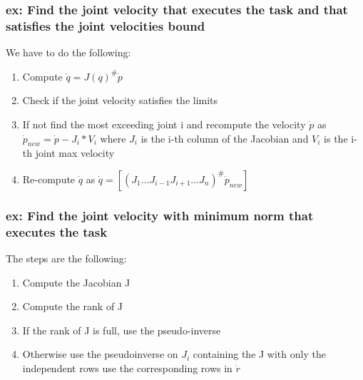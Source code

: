 \documentclass[a4paper,12pt]{article}
\begin{document}
\subsubsection{ex: Find the joint velocity that executes the task and that satisfies the joint velocities bound}
We have to do the following:
\begin{enumerate}
    \item Compute $\dot{q}=J(q)^{\#}\dot{p}$
    \item Check if the joint velocity satisfies the limits
    \item If not find  the most exceeding joint i and recompute the 
    velocity $\dot{p}$ as $\dot{p}_{new}=\dot{p} - J_i*V_i$
    where $J_i$ is the i-th column of the Jacobian and $V_i$ is 
    the i-th joint max velocity
    \item Re-compute $\dot{q}$ as $\dot{q}=[(J_1 \dots J_{i-1}J_{i+1} \dots J_n)^{\#}\dot{p}_{new}]$
\end{enumerate}

\subsubsection{ex: Find the joint velocity with minimum norm that executes the task}
    The steps are the following:
    \begin{enumerate}
        \item Compute the Jacobian J
        \item Compute the rank of J
        \item If the rank of J is full, use the pseudo-inverse
        \item Otherwise use the pseudoinverse on $J_i$ containing the J
         with only the independent rows use the corresponding rows in $\dot{r}$
    \end{enumerate}
\end{document}
